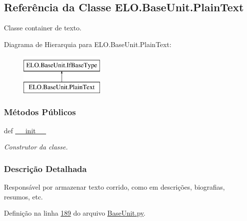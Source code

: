 \hypertarget{classELO_1_1BaseUnit_1_1PlainText}{\subsection{Referência da Classe E\-L\-O.\-Base\-Unit.\-Plain\-Text}
\label{classELO_1_1BaseUnit_1_1PlainText}
}


Classe container de texto.  


Diagrama de Hierarquia para E\-L\-O.\-Base\-Unit.\-Plain\-Text\-:\begin{figure}[H]
\begin{center}
\leavevmode
\includegraphics[height=2.000000cm]{d4/d2d/classELO_1_1BaseUnit_1_1PlainText}
\end{center}
\end{figure}
\subsubsection*{Métodos Públicos}
\begin{DoxyCompactItemize}
\item 
def \hyperlink{classELO_1_1BaseUnit_1_1PlainText_a2cd4f19585b5e8e8279f8052307d031f}{\-\_\-\-\_\-init\-\_\-\-\_\-}
\begin{DoxyCompactList}\small\item\em Construtor da classe. \end{DoxyCompactList}\end{DoxyCompactItemize}


\subsubsection{Descrição Detalhada}
Responsável por armazenar texto corrido, como em descrições, biografias, resumos, etc. 

Definição na linha \hyperlink{BaseUnit_8py_source_l00189}{189} do arquivo \hyperlink{BaseUnit_8py_source}{Base\-Unit.\-py}.



